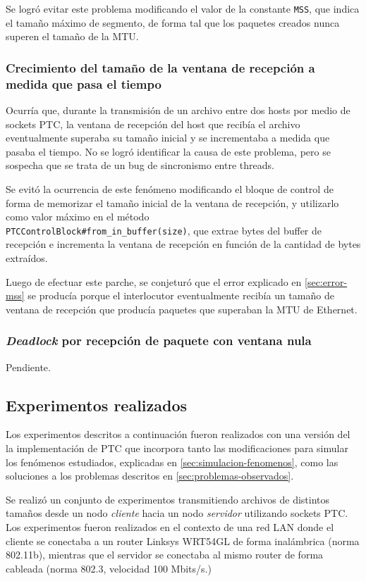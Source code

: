 \documentclass[a4paper, 10pt, twoside]{article}
\begin{document}
Se logró evitar este problema modificando el valor de la constante \texttt{MSS}, que indica el tamaño máximo de segmento, de forma tal que los paquetes creados nunca superen el tamaño de la MTU.


\subsubsection{Crecimiento del tamaño de la ventana de recepción a medida que pasa el tiempo}

Ocurría que, durante la transmisión de un archivo entre dos hosts por medio de sockets PTC, la ventana de recepción del host que recibía el archivo eventualmente superaba su tamaño inicial y se incrementaba a medida que pasaba el tiempo. No se logró identificar la causa de este problema, pero se sospecha que se trata de un bug de sincronismo entre threads.

Se evitó la ocurrencia de este fenómeno modificando el bloque de control de forma de memorizar el tamaño inicial de la ventana de recepción, y utilizarlo como valor máximo en el método \\ \texttt{PTCControlBlock\#from\_in\_buffer(size)}, que extrae bytes del buffer de recepción e incrementa la ventana de recepción en función de la cantidad de bytes extraídos.

Luego de efectuar este parche, se conjeturó que el error explicado en \ref{sec:error-mss} se producía porque el interlocutor eventualmente recibía un tamaño de ventana de recepción que producía paquetes que superaban la MTU de Ethernet.


\subsubsection{\emph{Deadlock} por recepción de paquete con ventana nula}

Pendiente.


\subsection{Experimentos realizados}
\label{sec:experimentos}

Los experimentos descritos a continuación fueron realizados con una versión del la implementación de PTC que incorpora tanto las modificaciones para simular los fenómenos estudiados, explicadas en \ref{sec:simulacion-fenomenos}, como las soluciones a los problemas descritos en \ref{sec:problemas-observados}.

Se realizó un conjunto de experimentos transmitiendo archivos de distintos tamaños desde un nodo \emph{cliente} hacia un nodo \emph{servidor} utilizando sockets PTC. Los experimentos fueron realizados en el contexto de una red LAN donde el cliente se conectaba a un router Linksys WRT54GL de forma inalámbrica (norma 802.11b), mientras que el servidor se conectaba al mismo router de forma cableada (norma 802.3, velocidad 100 Mbits/s.)
\end{document}
